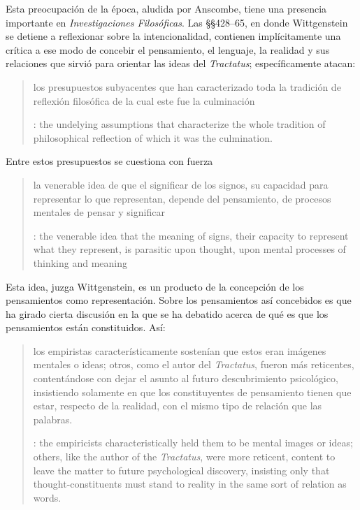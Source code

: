   Esta preocupación de la época, aludida por Anscombe, tiene una presencia importante en \emph{Investigaciones Filosóficas}. Las \S\S428--65, en donde Wittgenstein se detiene a reflexionar sobre la intencionalidad, contienen implícitamente una crítica a ese modo de concebir el pensamiento, el lenguaje, la realidad y sus relaciones que sirvió para orientar las ideas del \emph{Tractatus}; específicamente atacan: \blockquote[{\cite[3]{hacker2000mind}}: the undelying assumptions that characterize the whole tradition of philosophical reflection of which it was the culmination.]{los presupuestos subyacentes que han caracterizado toda la tradición de reflexión filosófica de la cual este fue la culminación}. Entre estos presupuestos se cuestiona con fuerza \blockquote[{\cite[3]{hacker2000mind}}: the venerable idea that the meaning of signs, their capacity to represent what they represent, is parasitic upon thought, upon mental processes of thinking and meaning]{la venerable idea de que el significar de los signos, su capacidad para representar lo que representan, depende del pensamiento, de procesos mentales de pensar y significar}. Esta idea, juzga Wittgenstein, es un producto de la concepción de los pensamientos como representación. Sobre los pensamientos así concebidos es que ha girado cierta discusión en la que se ha debatido acerca de qué es que los pensamientos están constituidos. Así: \blockquote[{\cite[3]{hacker2000mind}}: the empiricists characteristically held them to be mental images or ideas; others, like the author of the \emph{Tractatus}, were more reticent, content to leave the matter to future psychological discovery, insisting only that thought-constituents must stand to reality in the same sort of relation as words.]{los empiristas característicamente sostenían que estos eran imágenes mentales o ideas; otros, como el autor del \emph{Tractatus}, fueron más reticentes, contentándose con dejar el asunto al futuro descubrimiento psicológico, insistiendo solamente en que los constituyentes de pensamiento tienen que estar, respecto de la realidad, con el mismo tipo de relación que las palabras.}

